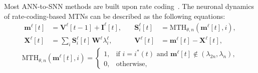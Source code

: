 Most ANN-to-SNN  methods are built upon rate coding~\cite{you2024spikezip,wang2022signed,wang2026training}. The neuronal dynamics of rate-coding-based MTNs can be described as the following equations: 
\begin{equation}
\begin{aligned}
\mathbf{m}^\ell[t] &= \mathbf{V}^\ell[t-1] + \mathbf{I}^{\ell}[t], &\quad
\mathbf{S}_i^\ell[t] &= \mathrm{MTH}_{\theta,n}(\mathbf{m}^\ell[t], i), \\
\mathbf{X}^\ell[t] &= \sum_i \mathbf{S}_i^\ell[t]\,\mathbf{W}^\ell \lambda_i^\ell, &\quad
\mathbf{V}^\ell[t] &= \mathbf{m}^\ell[t] - \mathbf{X}^\ell[t],
\end{aligned}
\end{equation}
\begin{equation}
\mathrm{MTH}_{\theta,n}(\mathbf{m}^\ell[t], i) = 
\begin{cases}
1, & \text{if } i = i^*(t) \text{ and } \mathbf{m}^\ell[t] \notin (\lambda_{2n}, \lambda_n), \\
0, & \text{otherwise},
\end{cases}
\end{equation}

